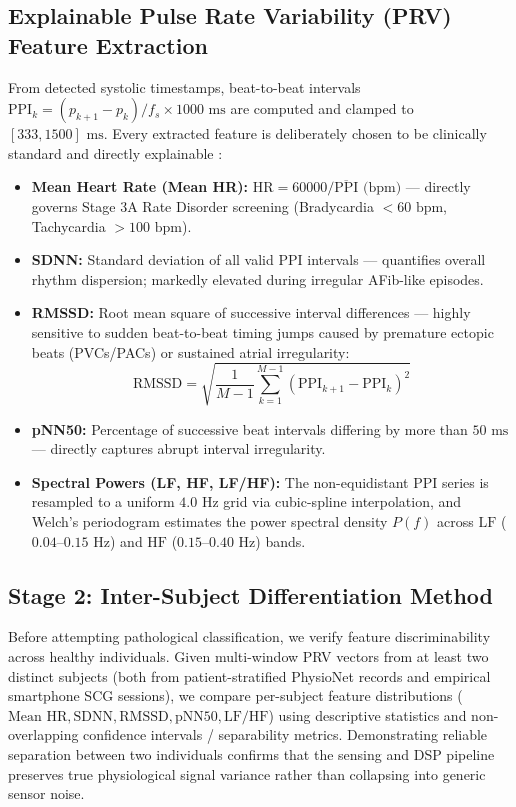\subsection{Explainable Pulse Rate Variability (PRV) Feature Extraction}
From detected systolic timestamps, beat-to-beat intervals $\text{PPI}_k = (p_{k+1} - p_k)/f_s \times 1000\text{ ms}$ are computed and clamped to $[333, 1500]\text{ ms}$. Every extracted feature is deliberately chosen to be clinically standard and directly explainable \cite{taskforce1996heart, tarvainen2014kubios, schafer2013accurate}:
\begin{itemize}
	\item \textbf{Mean Heart Rate (Mean HR):} $\text{HR} = 60000 / \overline{\text{PPI}}\text{ (bpm)}$ --- directly governs Stage 3A Rate Disorder screening (Bradycardia $< 60\text{ bpm}$, Tachycardia $> 100\text{ bpm}$).
	\item \textbf{SDNN:} Standard deviation of all valid PPI intervals --- quantifies overall rhythm dispersion; markedly elevated during irregular AFib-like episodes.
	\item \textbf{RMSSD:} Root mean square of successive interval differences --- highly sensitive to sudden beat-to-beat timing jumps caused by premature ectopic beats (PVCs/PACs) or sustained atrial irregularity:
	\begin{equation}
		\text{RMSSD} = \sqrt{\frac{1}{M-1}\sum_{k=1}^{M-1} (\text{PPI}_{k+1} - \text{PPI}_k)^2}
	\end{equation}
	\item \textbf{pNN50:} Percentage of successive beat intervals differing by more than $50\text{ ms}$ --- directly captures abrupt interval irregularity.
	\item \textbf{Spectral Powers (LF, HF, LF/HF):} The non-equidistant PPI series is resampled to a uniform $4.0\text{ Hz}$ grid via cubic-spline interpolation, and Welch's periodogram \cite{welch1967use} estimates the power spectral density $P(f)$ across $\text{LF}$ ($0.04\text{--}0.15\text{ Hz}$) and $\text{HF}$ ($0.15\text{--}0.40\text{ Hz}$) bands.
\end{itemize}

\subsection{Stage 2: Inter-Subject Differentiation Method}
Before attempting pathological classification, we verify feature discriminability across healthy individuals. Given multi-window PRV vectors from at least two distinct subjects (both from patient-stratified PhysioNet records and empirical smartphone SCG sessions), we compare per-subject feature distributions ($\text{Mean HR}, \text{SDNN}, \text{RMSSD}, \text{pNN50}, \text{LF/HF}$) using descriptive statistics and non-overlapping confidence intervals / separability metrics. Demonstrating reliable separation between two individuals confirms that the sensing and DSP pipeline preserves true physiological signal variance rather than collapsing into generic sensor noise.

